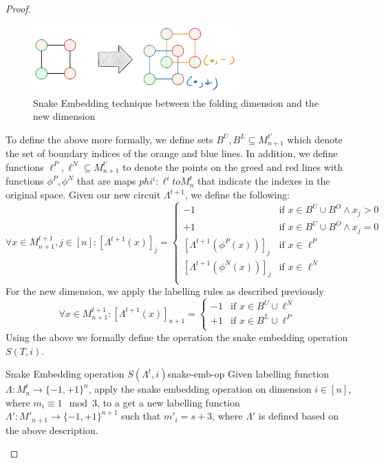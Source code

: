 \begin{proof}
    \begin{figure}[h!]
        \centering
        \includegraphics[width=0.7\textwidth]{Chapter3/2d-to-3d-snake-sol.pdf}
        \caption{Snake Embedding technique between the folding dimension and the new dimension}
        \label{fig:chap-3:snake-embedding-2d-to-3d-sol}
    \end{figure}

    To define the above more formally, we define sets $B^U,B^L \subseteq M^{t'}_{n+1}$
    which denote the set of boundary indices of the orange and blue lines.
    In addition, we define functions $\ell^P, \ell^N \subseteq M^{t'}_{n+1}$ to denote the points on the greed and red lines
    with functions $\phi^P, \phi^N$  that are maps $phi^i: \ell^i to M^t_n$ that indicate the indexes in the original space.
    Given our new circuit $\Lambda^{t+1}$, we define the following:
    $$
        \forall x \in M^{t+1}_{n+1}, j\in [n]:  [\Lambda^{t+1}(x)]_j = \begin{cases}
            -1                           & \text{if  }  x \in B^U \cup B^O \wedge x_j > 0 \\
            +1                           & \text{if  }  x \in B^U \cup B^O \wedge x_j = 0 \\
            [\Lambda^{t+1}(\phi^P(x))]_j & \text{if } x \in \ell^P                        \\
            [\Lambda^{t+1}(\phi^N(x))]_j & \text{if } x \in \ell^N                        \\
        \end{cases}
    $$
    For the new dimension, we apply the labelling rules as described previously
    $$
        \forall x \in M^{t+1}_{n+1}:  [\Lambda^{t+1}(x)]_{n+1} = \begin{cases}
            -1 & \text{if  }  x \in B^U \cup \ell^N \\
            +1 & \text{if  }  x \in B^L \cup \ell^P \\
        \end{cases}
    $$
    Using the above we formally define the operation the snake embedding operation $S(T, i)$.

    \begin{definitionbox}{Snake Embedding operation $S(\Lambda^t, i)$}{snake-emb-op}
        Given labelling function $\Lambda: M^t_n \to \{-1, +1\}^n$, apply the snake embedding operation
        on dimension $i \in [n]$, where $m_i \equiv 1 \mod 3$, to a get a new labelling function
        $\Lambda': M'_{n+1} \to \{-1, +1\}^{n+1}$ such that $m'_i = s + 3$, where $\Lambda'$ is defined
        based on the above description.
    \end{definitionbox}


\end{proof}
